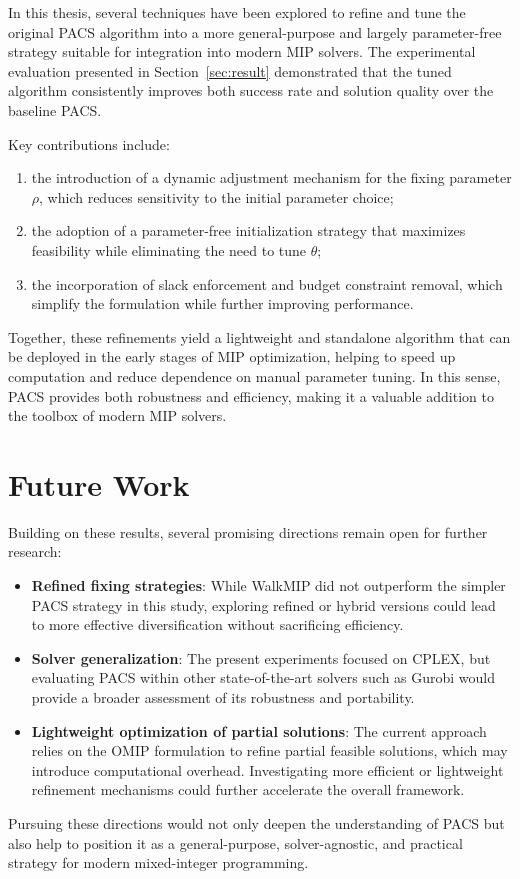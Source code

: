 In this thesis, several techniques have been explored to refine and tune the original PACS algorithm into a more general-purpose and largely parameter-free strategy suitable for integration into modern MIP solvers. The experimental evaluation presented in Section~\ref{sec:result} demonstrated that the tuned algorithm consistently improves both success rate and solution quality over the baseline PACS.

Key contributions include:
\begin{enumerate}
    \item the introduction of a dynamic adjustment mechanism for the fixing parameter $\rho$, which reduces sensitivity to the initial parameter choice;
    \item the adoption of a parameter-free initialization strategy that maximizes feasibility while eliminating the need to tune $\theta$;
    \item the incorporation of slack enforcement and budget constraint removal, which simplify the formulation while further improving performance.
\end{enumerate}
Together, these refinements yield a lightweight and standalone algorithm that can be deployed in the early stages of MIP optimization, helping to speed up computation and reduce dependence on manual parameter tuning. In this sense, PACS provides both robustness and efficiency, making it a valuable addition to the toolbox of modern MIP solvers.

\section{Future Work}
Building on these results, several promising directions remain open for further research:
\begin{itemize}
    \item \textbf{Refined fixing strategies}: While WalkMIP did not outperform the simpler PACS strategy in this study, exploring refined or hybrid versions could lead to more effective diversification without sacrificing efficiency.
    \item \textbf{Solver generalization}: The present experiments focused on CPLEX, but evaluating PACS within other state-of-the-art solvers such as Gurobi would provide a broader assessment of its robustness and portability.
    \item \textbf{Lightweight optimization of partial solutions}: The current approach relies on the OMIP formulation to refine partial feasible solutions, which may introduce computational overhead. Investigating more efficient or lightweight refinement mechanisms could further accelerate the overall framework.
\end{itemize}

Pursuing these directions would not only deepen the understanding of PACS but also help to position it as a general-purpose, solver-agnostic, and practical strategy for modern mixed-integer programming.